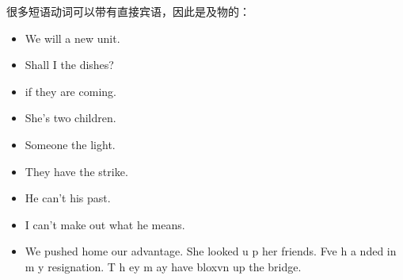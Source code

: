 很多短语动词可以带有直接宾语，因此是及物的：
\begin{itemize}
\item We will  a new unit.
\item Shall I  the dishes?
\item {} if they are coming.
\item She's  two children.
\item Someone  the light.
\item They have  the strike.
\item He can't  his past.
\item I can't make out what he means.
\item We pushed home our advantage.
She looked u p her friends.
Fve h a nded in m y resignation.
T h ey m ay have bloxvn up the bridge.

\end{itemize}
















